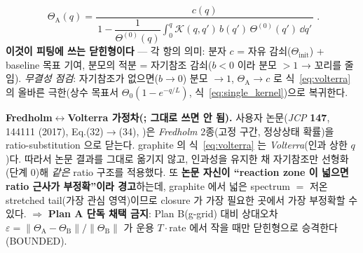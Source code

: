 \begin{equation}
\boxed{\;\Theta_\mathrm A(q)=\frac{c(q)}{\,1-\dfrac{1}{\Theta^{(0)}(q)}\displaystyle\int_0^q\mathcal K(q,q')\,b(q')\,\Theta^{(0)}(q')\,\dd q'\,}\;.}
\label{eq:closed}
\end{equation}
\textbf{이것이 피팅에 쓰는 닫힌형이다} — 각 항의 의미: 분자 $c$ = 자유 감쇠($\Theta_\mathrm{init}$) + baseline
목표 기여, 분모의 적분 = 자기참조 감쇠($b<0$ 이라 분모 $>1$ → 꼬리를 줄임). \emph{무결성 점검}: 자기참조가
없으면($b\to0$) 분모 $\to1$, $\Theta_\mathrm A\to c$ 로 식~\eqref{eq:volterra} 의 올바른 극한(상수 목표서
$\Theta_0(1-e^{-q/L})$, 식~\eqref{eq:single_kernel})으로 복귀한다.
\begin{boundbox}
\textbf{Fredholm$\leftrightarrow$Volterra 가정차(; 그대로 쓰면 안 됨).} 사용자 논문(\emph{JCP}
\textbf{147}, 144111 (2017), Eq.(32)$\to$(34), \cite{jcp2017})은 \emph{Fredholm} 2종(고정 구간, 정상상태 확률)을
ratio-substitution 으로 닫는다. graphite 의 식~\eqref{eq:volterra} 는 \emph{Volterra}(인과 상한 $q$)다. 따라서
논문 결과를 그대로 옮기지 않고, 인과성을 유지한 채 자기참조만 선형화(단계 0)해 \emph{같은} ratio 구조를 적용했다.
또 \textbf{논문 자신이 ``reaction zone 이 넓으면 ratio 근사가 부정확''이라 경고}하는데, graphite 에서 넓은
spectrum $=$ 저온 stretched tail(가장 관심 영역)이므로 closure 가 가장 필요한 곳에서 가장 부정확할 수 있다.
$\Rightarrow$ \textbf{Plan A 단독 채택 금지}: Plan B(g-grid) 대비 상대오차
$\varepsilon=\lVert\Theta_\mathrm A-\Theta_\mathrm B\rVert/\lVert\Theta_\mathrm B\rVert$ 가 운용 $T\cdot$rate 에서
작을 때만 닫힌형으로 승격한다(BOUNDED).
\end{boundbox}

